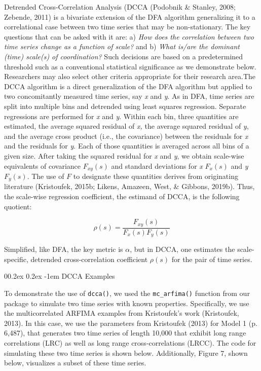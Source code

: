 \documentclass[
  man]{apa6}
\makeatletter
\let\oldparagraph\paragraph
\renewcommand{\paragraph}[1]{\oldparagraph{#1}\mbox{}}
\renewcommand{\paragraph}{\@startsection{paragraph}{4}{\parindent}%
  {0\baselineskip \@plus 0.2ex \@minus 0.2ex}%
  {-1em}%
  {\normalfont\normalsize\bfseries\itshape\typesectitle}}
\makeatother
\begin{document}
Detrended Cross-Correlation Analysis (DCCA
(Podobnik \& Stanley, 2008; Zebende, 2011) is a bivariate extension of
the DFA algorithm generalizing it to a correlational case between two
time series that may be non-stationary. The key questions that can be
asked with it are: a) \emph{How does the correlation between two time series
change as a function of scale?} and b) \emph{What is/are the dominant (time)
scale(s) of coordination?} Such decisions are based on a predetermined
threshold such as a conventional statistical significance as we
demonstrate below. Researchers may also select other criteria
appropriate for their research area.The DCCA algorithm is a direct
generalization of the DFA algorithm but applied to two concomitantly
measured time series, say \emph{x} and \emph{y}. As in DFA, time series are split
into multiple bins and detrended using least squares regression.
Separate regressions are performed for \emph{x} and \emph{y}. Within each bin,
three quantities are estimated, the average squared residual of \emph{x,} the
average squared residual of \emph{y}, and the average cross product (i.e.,
the covariance) between the residuals for \emph{x} and the residuals for \emph{y}.
Each of those quantities is averaged across all bins of a given size.
After taking the squared residual for \emph{x} and \emph{y}, we obtain scale-wise
equivalents of covariance \(F_{xy}(s)\) and standard deviations for \emph{x}
\(F_x(s)\) and \emph{y} \(F_y(s)\). The use of \(F\) to designate these quantities
derives from originating literature (Kristoufek, 2015b; Likens, Amazeen, West, \& Gibbons, 2019b).
Thus, the scale-wise regression coefficient, the estimand of DCCA, is
the following quotient:

\[\rho(s)=\frac{F_{xy}(s)}{F_x(s)F_y(s)}\]

Simplified, like DFA, the key metric is \(\alpha\), but in DCCA, one
estimates the scale-specific, detrended cross-correlation coefficient
\(\rho(s)\) for the pair of time series.

\hypertarget{dcca-examples}{%
\paragraph{DCCA Examples}\label{dcca-examples}}

To demonstrate the use of \texttt{dcca()}, we used the \texttt{mc\_arfima()} function
from our package to simulate two time series with known properties.
Specifically, we use the multicorrelated ARFIMA examples from
Kristoufek's work (Kristoufek, 2013). In
this case, we use the parameters from Kristoufek (2013) for Model 1 (p.
6,487), that generates two time series of length 10,000 that exhibit
long range correlations (LRC) as well as long range cross-correlations
(LRCC). The code for simulating these two time series is shown below.
Additionally, Figure 7, shown below, visualizes a subset of these time
series.
\end{document}
